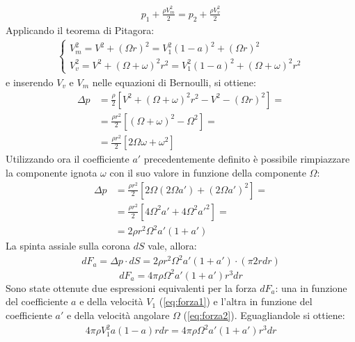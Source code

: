 \begin{align*}
p_1 + \frac{\rho V_m^2}{2} = p_2 + \frac{\rho V_v^2}{2}
\end{align*}
Applicando il teorema di Pitagora:
\begin{align*}
\begin{cases}
V_m^2 = V^2 + \left( \Omega r \right)^2 = V_1^2 \left(1-a \right)^2 + \left( \Omega r \right)^2\\
V_v^2 = V^2 + \left( \Omega + \omega \right)^2 r^2= V_1^2 \left(1-a \right)^2 + \left( \Omega + \omega \right)^2 r^2
\end{cases}
\end{align*}
e inserendo $V_v$ e $V_m$ nelle equazioni di Bernoulli, si ottiene:
\begin{align*}
\Delta p & =\frac{\rho}{2} \left[ V^2 + \left( \Omega + \omega \right)^2 r^2 - V^2 - \left( \Omega r \right)^2 \right]=\\
& =\frac{\rho r^2}{2} \left[ \left( \Omega + \omega \right)^2 - \Omega^2 \right]= \\
& =\frac{\rho r^2}{2} \left[ 2 \Omega \omega + \omega^2 \right]
\end{align*}
Utilizzando ora il coefficiente $a'$ precedentemente definito è possibile rimpiazzare la componente ignota $\omega$ con il suo valore in funzione della componente $\Omega$:
\begin{align*}
\Delta p &= \frac{\rho r^2}{2} \left[ 2 \Omega \left( 2 \Omega a'\right) + \left( 2 \Omega a' \right)^2 \right]=\\
&= \frac{\rho r^2}{2} \left[ 4 \Omega^2 a' + 4 \Omega^2 a'^2 \right] = \\
&= 2 \rho r^2 \Omega^2 a' \left( 1+a' \right)
\end{align*}
La spinta assiale sulla corona $dS$ vale, allora:
\begin{align*}
dF_a = \Delta p \cdot dS = 2 \rho r^2 \Omega^2 a' \left(1 + a' \right) \cdot \left( \pi 2 r dr \right)
\end{align*}
\begin{equation}\label{eq:forza2}
dF_a = 4 \pi \rho \Omega^2 a' \left( 1+ a' \right) r^3 dr
\end{equation}
Sono state ottenute due espressioni equivalenti per la forza $dF_a$: una in funzione del coefficiente $a$ e della velocità $V_1$ (\ref{eq:forza1}) e l'altra in funzione del coefficiente $a'$ e della velocità angolare $\Omega$ (\ref{eq:forza2}). Eguagliandole si ottiene:
\begin{align*}
4 \pi \rho V_1^2 a \left( 1 - a \right) r dr = 4 \pi \rho \Omega^2 a' \left( 1 + a' \right) r^3 dr
\end{align*}
